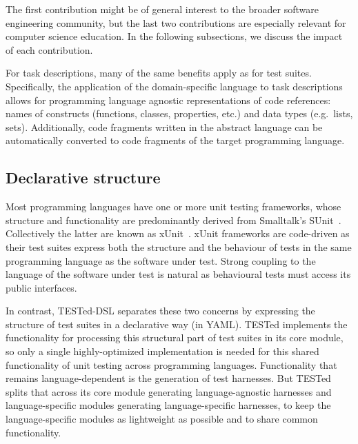 \documentclass[../main]{subfiles}
\begin{document}
The first contribution might be of general interest to the broader software engineering community, but the last two contributions are especially relevant for computer science education.
In the following subsections, we discuss the impact of each contribution.

For task descriptions, many of the same benefits apply as for test suites.
Specifically, the application of the domain-specific language to task descriptions allows for programming language agnostic representations of code references: names of constructs (functions, classes, properties, etc.) and data types (e.g.\ lists, sets).
Additionally, code fragments written in the abstract language can be automatically converted to code fragments of the target programming language.

\subsection{Declarative structure}\label{subsec:dsl-declarative-structure}

Most programming languages have one or more unit testing frameworks, whose structure and functionality are predominantly derived from Smalltalk's SUnit~\autocite{beckSimpleSmalltalkTesting1997}.
Collectively the latter are known as xUnit~\autocite{meszarosXUnitTestPatterns2007}.
xUnit frameworks are code-driven as their test suites express both the structure and the behaviour of tests in the same programming language as the software under test.
Strong coupling to the language of the software under test is natural as behavioural tests must access its public interfaces.

In contrast, TESTed-DSL separates these two concerns by expressing the structure of test suites in a declarative way (in YAML).
TESTed implements the functionality for processing this structural part of test suites in its core module, so only a single highly-optimized implementation is needed for this shared functionality of unit testing across programming languages.
Functionality that remains language-dependent is the generation of test harnesses.
But TESTed splits that across its core module generating language-agnostic harnesses and language-specific modules generating language-specific harnesses, to keep the language-specific modules as lightweight as possible and to share common functionality.
\end{document}
